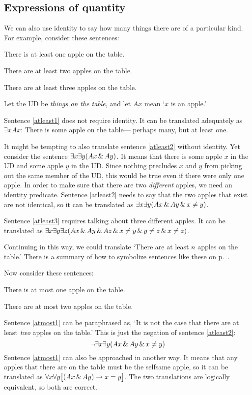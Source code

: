 \subsection{Expressions of quantity}
We can also use identity to say how many things there are of a particular kind. For example, consider these sentences:
\begin{earg}
\item[\ex{atleast1}] There is at least one apple on the table.
\item[\ex{atleast2}] There are at least two apples on the table.
\item[\ex{atleast3}] There are at least three apples on the table.
\end{earg}
Let the UD be \emph{things on the table}, and let $Ax$ mean `$x$ is an apple.'

Sentence \ref{atleast1} does not require identity. It can be translated adequately as $\exists x Ax$: There is some apple on the table--- perhaps many, but at least one.

It might be tempting to also translate sentence \ref{atleast2} without identity. Yet consider the sentence $\exists x \exists y(Ax \,\&\, Ay)$. It means that there is some apple $x$ in the UD and some apple $y$ in the UD. Since nothing precludes $x$ and $y$ from picking out the same member of the UD, this would be true even if there were only one apple. In order to make sure that there are two \emph{different} apples, we need an identity predicate. Sentence \ref{atleast2} needs to say that the two apples that exist are not identical, so it can be translated as $\exists x \exists y(Ax \,\&\, Ay \,\&\, x\neq y)$.

Sentence \ref{atleast3} requires talking about three different apples. It can be translated as $\exists x \exists y\exists z(Ax \,\&\, Ay \,\&\, Az \,\&\, x\neq y \,\&\, y\neq z \,\&\, x \neq z)$.

Continuing in this way, we could translate `There are at least $n$ apples on the table.' There is a summary of how to symbolize sentences like these on p.~\pageref{summary.atleast}.


Now consider these sentences:
\begin{earg}
\item[\ex{atmost1}] There is at most one apple on the table.
\item[\ex{atmost2}] There are at most two apples on the table.
\end{earg}

Sentence \ref{atmost1} can be paraphrased as, `It is not the case that there are at least \emph{two} apples on the table.' This is just the negation of sentence \ref{atleast2}: $$\neg \exists x \exists y(Ax \,\&\, Ay \,\&\, x\neq y)$$
Sentence \ref{atmost1} can also be approached in another way. It means that any apples that there are on the table must be the selfsame apple, so it can be translated as $\forall x\forall y\bigl[(Ax \,\&\, Ay) \rightarrow x=y\bigr]$. The two translations are logically equivalent, so both are correct.

